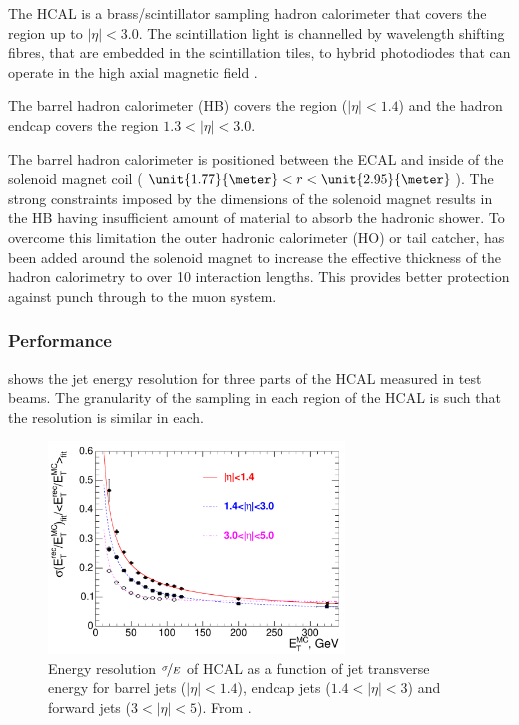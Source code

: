 The {HCAL} is a brass/scintillator
sampling hadron calorimeter that covers the region up to $|\eta|<3.0$.  The
scintillation light is channelled by wavelength shifting fibres, that are
embedded in the scintillation tiles, to hybrid photodiodes that can operate in
the high axial magnetic field \cite{chatrchyan2008cms}.

The barrel hadron calorimeter (HB) covers the region ($|\eta| < 1.4$)
and the hadron endcap covers the region $1.3 < |\eta| < 3.0$.

The barrel hadron calorimeter is
positioned between the ECAL and inside of the solenoid magnet coil
($\unit{1.77}{\meter}<r<\unit{2.95}{\meter}$).
The strong constraints imposed by the dimensions of the solenoid magnet results
in the HB having insufficient amount of material to absorb the hadronic shower. 
To overcome this limitation the outer hadronic calorimeter (HO) or tail catcher,
has been added around the solenoid magnet to increase the
effective thickness of the hadron calorimetry to over 10 interaction lengths.
This provides better protection against punch through to the muon system.

\subsubsection{Performance}

 shows the jet energy resolution for three parts of
the {HCAL} measured in test beams. The granularity of the sampling in each
region of the HCAL is such that the resolution is similar in each.
\begin{figure}[htbp]
  \centering
  \includegraphics[width=0.7\textwidth]{hcal_performance}
  \caption{Energy resolution $\nicefrac{\sigma}{E}$ of HCAL as a function of jet
transverse energy for barrel jets ($|\eta| < 1.4$), endcap jets ($1.4<|\eta| <
3$) and forward jets ($3<|\eta| < 5$). From \cite{chatrchyan2008cms}. }
  \label{fig:hcalperform}
\end{figure}

